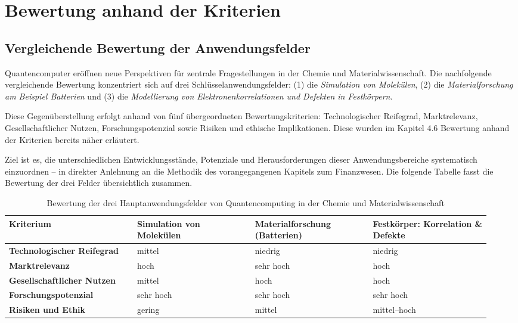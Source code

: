 \section{Bewertung anhand der Kriterien}
\label{Chemie_Bewertung}

\subsection{Vergleichende Bewertung der Anwendungsfelder}

Quantencomputer eröffnen neue Perspektiven für zentrale Fragestellungen in der Chemie und Materialwissenschaft. Die nachfolgende vergleichende Bewertung konzentriert sich auf drei Schlüsselanwendungsfelder: (1) die \textit{Simulation von Molekülen}, (2) die \textit{Materialforschung am Beispiel Batterien} und (3) die \textit{Modellierung von Elektronenkorrelationen und Defekten in Festkörpern}.

Diese Gegenüberstellung erfolgt anhand von fünf übergeordneten Bewertungskriterien: Technologischer Reifegrad, Marktrelevanz, Gesellschaftlicher Nutzen, Forschungspotenzial sowie Risiken und ethische Implikationen. Diese wurden im Kapitel 4.6 Bewertung anhand der Kriterien bereits näher erläutert.

Ziel ist es, die unterschiedlichen Entwicklungsstände, Potenziale und Herausforderungen dieser Anwendungsbereiche systematisch einzuordnen – in direkter Anlehnung an die Methodik des vorangegangenen Kapitels zum Finanzwesen. Die folgende Tabelle fasst die Bewertung der drei Felder übersichtlich zusammen.

\begin{table}[h]
\centering
\begin{tabular}{|p{0.25\linewidth}|p{0.23\linewidth}|p{0.23\linewidth}|p{0.23\linewidth}|}
\hline
\textbf{Kriterium} & \textbf{Simulation von Molekülen} & \textbf{Materialforschung (Batterien)} & \textbf{Festkörper: Korrelation \& Defekte} \\
\hline
\textbf{Techno\-logischer Reife\-grad} & mittel & niedrig & niedrig \\
\hline
\textbf{Markt\-relevanz} & hoch & sehr hoch & hoch \\
\hline
\textbf{Gesell\-schaft\-licher Nutzen} & mittel & hoch & hoch \\
\hline
\textbf{Forschungs\-potenzial} & sehr hoch & sehr hoch & sehr hoch \\
\hline
\textbf{Risiken und Ethik} & gering & mittel & mittel--hoch \\
\hline
\end{tabular}
\caption{Bewertung der drei Hauptanwendungsfelder von Quantencomputing in der Chemie und Materialwissenschaft}
\label{tab:qc-chemie-bewertung}
\end{table}



